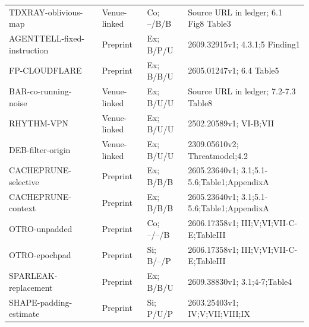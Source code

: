 \begin{longtable}{@{}p{}p{}p{}p{}@{}}
TDXRAY-\allowbreak{}oblivious-\allowbreak{}map~\cite{hornetz2026tdxray} & Venue-linked & Co; --/B/B & Source URL in ledger; 6.1 Fig8 Table3\\
AGENTTELL-\allowbreak{}fixed-\allowbreak{}instruction~\cite{shahriar2026agenttell} & Preprint & Ex; B/P/U & 2609.32915v1; 4.3.1;5 Finding1\\
FP-\allowbreak{}CLOUDFLARE~\cite{wang2026fpagent} & Preprint & Ex; B/B/U & 2605.01247v1; 6.4 Table5\\
BAR-\allowbreak{}co-\allowbreak{}running-\allowbreak{}noise~\cite{gu2026behindbars} & Venue-linked & Ex; B/U/U & Source URL in ledger; 7.2-7.3 Table8\\
RHYTHM-\allowbreak{}VPN~\cite{alhazbi2025rhythm} & Venue-linked & Ex; B/U/U & 2502.20589v1; VI-B;VII\\
DEB-\allowbreak{}filter-\allowbreak{}origin~\cite{debenedetti2024privacy} & Venue-linked & Ex; B/U/U & 2309.05610v2; Threatmodel;4.2\\
CACHEPRUNE-\allowbreak{}selective~\cite{wu2026cacheprune} & Preprint & Ex; B/B/B & 2605.23640v1; 3.1;5.1-5.6;Table1;AppendixA\\
CACHEPRUNE-\allowbreak{}context~\cite{wu2026cacheprune} & Preprint & Ex; B/B/B & 2605.23640v1; 3.1;5.1-5.6;Table1;AppendixA\\
OTRO-\allowbreak{}unpadded~\cite{lee2026otro} & Preprint & Co; --/--/B & 2606.17358v1; III;V;VI;VII-C-E;TableIII\\
OTRO-\allowbreak{}epochpad~\cite{lee2026otro} & Preprint & Si; B/--/P & 2606.17358v1; III;V;VI;VII-C-E;TableIII\\
SPARLEAK-\allowbreak{}replacement~\cite{chen2026sparleak} & Preprint & Ex; B/B/U & 2609.38830v1; 3.1;4-7;Table4\\
SHAPE-\allowbreak{}padding-\allowbreak{}estimate~\cite{hadad2026shape} & Preprint & Si; P/U/P & 2603.25403v1; IV;V;VII;VIII;IX\\
\end{longtable}
